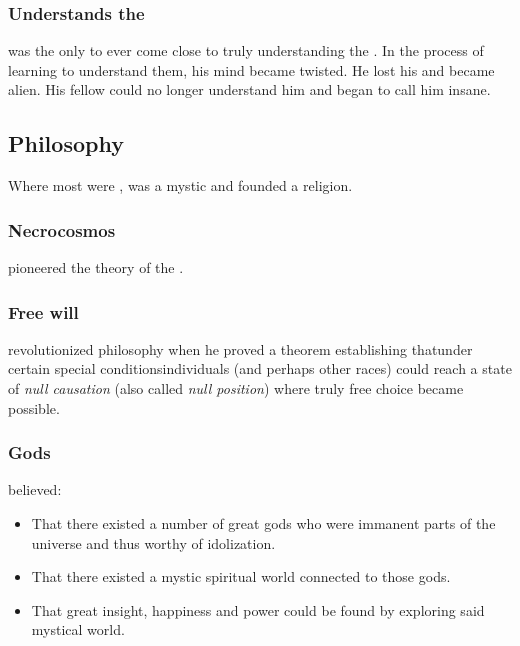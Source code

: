 \subsubsection{Understands the \xss}
\Sethicus was the only \dragon to ever come close to truly understanding the \xss.
In the process of learning to understand them, his mind became twisted. 
He lost his  and became alien. 
His fellow \ophidians could no longer understand him and began to call him insane.









\subsection{Philosophy}
Where most \ophidians were , \Sethicus was a mystic and founded a religion. 





\subsubsection{Necrocosmos}
\Sethicus pioneered the theory of the . 





\subsubsection{Free will}
\Sethicus revolutionized \caisith philosophy when he proved a theorem establishing that\dash under certain special conditions\dash \caisith individuals (and perhaps other races) could reach a state of \emph{null causation} (also called \emph{null position}) where truly free choice became possible. 





\subsubsection{Gods}
\Sethicus believed:
\begin{itemize}
  \item 
    That there existed a number of great gods who were immanent parts of the universe and thus worthy of idolization.
  \item 
    That there existed a mystic spiritual world connected to those gods.
  \item
    That great insight, happiness and power could be found by exploring said mystical world.
\end{itemize}

